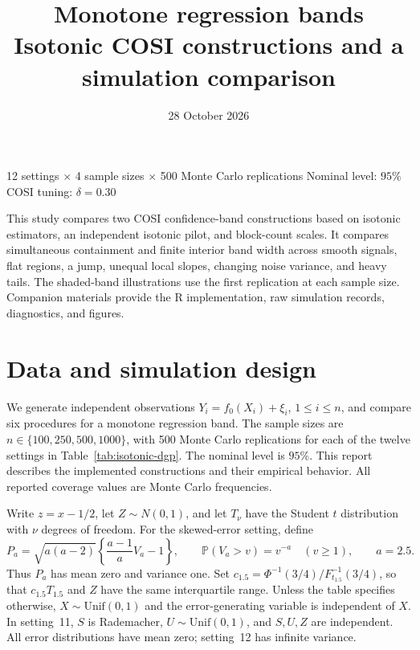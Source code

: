 \documentclass[10pt]{article}
\title{\color{ink}Monotone regression bands\\[4pt]
  \large Isotonic COSI constructions and a simulation comparison}
\author{}\date{28 October 2026}
\begin{document}
\maketitle
\vspace{-1.5em}
\begin{center}\small
12 settings $\times$ 4 sample sizes $\times$ 500 Monte Carlo replications\quad
Nominal level: $95\%$\quad COSI tuning: $\delta=0.30$
\end{center}
This study compares two COSI confidence-band constructions based on
isotonic estimators, an independent isotonic pilot, and block-count scales.
It compares simultaneous containment and finite interior band width across
smooth signals, flat regions, a jump, unequal local slopes, changing noise
variance, and heavy tails. The shaded-band illustrations use the first
replication at each sample size. Companion materials provide the R implementation, raw simulation records,
diagnostics, and figures.
\section{Data and simulation design}
We generate independent observations
$Y_i=f_0(X_i)+\xi_i$, $1\le i\le n$, and compare six procedures for a monotone regression band. The sample sizes are $n\in\{100,250,500,1000\}$, with 500 Monte Carlo replications for each of the twelve settings in Table~\ref{tab:isotonic-dgp}. The nominal level is $95\%$. This report describes the implemented constructions and their empirical behavior. All reported coverage values are Monte Carlo frequencies.

Write $z=x-1/2$, let $Z\sim N(0,1)$, and let $T_\nu$ have the Student $t$ distribution with $\nu$ degrees of freedom. For the skewed-error setting, define
\[
 P_a=\sqrt{a(a-2)}\left\{\frac{a-1}{a}V_a-1\right\},\qquad
 \mathbb P(V_a>v)=v^{-a}\quad(v\ge1),\qquad a=2.5.
\]
Thus $P_a$ has mean zero and variance one. Set
$c_{1.5}=\Phi^{-1}(3/4)/F_{t_{1.5}}^{-1}(3/4)$, so that $c_{1.5}T_{1.5}$ and $Z$ have the same interquartile range. Unless the table specifies otherwise, $X\sim\mathrm{Unif}(0,1)$ and the error-generating variable is independent of $X$. In setting~11, $S$ is Rademacher, $U\sim\mathrm{Unif}(0,1)$, and $S,U,Z$ are independent. All error distributions have mean zero; setting~12 has infinite variance.
\end{document}
